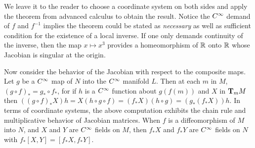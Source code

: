 \documentclass[../main]{subfiles}
\begin{document}
We leave it to the reader to choose a coordinate system on both sides and apply the theorem from advanced calculus to obtain the result. Notice the $\CInfty$ demand of $f$ and $f^{-1}$ implies the theorem could be stated as \emph{necessary} as well as sufficient condition for the existence of a local inverse. If one only demands continuity of the inverse, then the map $x\mapsto x^3$ provides a homeomorphism of $\bR$ onto $\bR$ whose Jacobian is singular at the origin.

Now consider the behavior of the Jacobian with respect to the composite maps. Let $g$ be a $\CInfty$ map of $N$ into the $\CInfty$ manifold $L$. Then at each $m$ in $M$, $(g\circ f)_*=g_*\circ f_*$, for if $h$ is a $\CInfty$ function about $g(f(m))$ and $X$ in $\tangentspace{M}{m}$ then $((g\circ f)_*X)h=X(h\circ g\circ f)=(f_*X)(h\circ g)=(g_*(f_*X))h$. In terms of coordinate systems, the above computation exhibits the chain rule and multiplicative behavior of Jacobian matrices. When $f$ is a diffeomorphism of $M$ into $N$, and $X$ and $Y$ are $\CInfty$ fields on $M$, then $f_*X$ and $f_*Y$ are $\CInfty$ fields on $N$ with $f_*[X,Y]=[f_*X,f_*Y]$.
\end{document}
